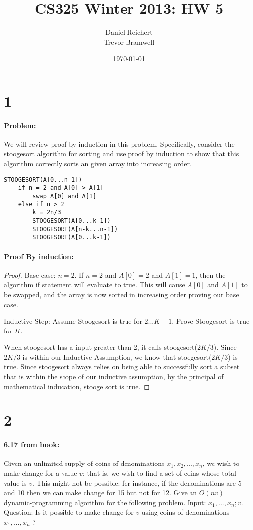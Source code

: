 \documentclass[12pt]{article}
\title{CS325 Winter 2013: HW 5}
\author{
    Daniel Reichert \\
    Trevor Bramwell \\
}
\date{\today}
\newcommand{\BigO}[1]{\ensuremath{O(#1)}}
\begin{document}
\maketitle
\section*{1}
\paragraph{Problem:}
We will review proof by induction in this problem. Specifically, consider the
stoogesort algorithm for sorting and use proof by induction to show that this
algorithm correctly sorts an given array into increasing order.
\begin{lstlisting}[mathescape]
STOOGESORT(A[0...n-1])
    if n = 2 and A[0] > A[1]
        swap A[0] and A[1]
    else if n > 2
        k = 2n/3
        STOOGESORT(A[0...k-1])
        STOOGESORT(A[n-k...n-1])
        STOOGESORT(A[0...k-1])
\end{lstlisting}
\paragraph{Proof By induction:}
\begin{proof}
Base case: $n = 2$.
If $n=2$ and $A[0] = 2$ and $A[1] = 1$, then the algorithm if statement will evaluate
to true.  This will cause $A[0]$ and $A[1]$ to be swapped, and the array is now
sorted in increasing order proving our base case.

Inductive Step:
Assume Stoogesort is true for $2...K-1$.
Prove Stoogesort is true for $K$.

When stoogesort has a input greater than 2, it calls stoogesort($2K/3$).  Since
$2K/3$ is within our Inductive Assumption, we know that stoogesort($2K/3$) is
true.  Since stoogesort always relies on being able to successfully sort a subset
that is within the scope of our inductive assumption, by the principal of
mathematical inducation, stooge sort is true.
\end{proof}

\section*{2}
\paragraph{6.17 from book:}
Given an unlimited supply of coins of denominations $x_1 , x_2 , . . . , x_n$,
we wish to make change for a value $v$; that is, we wish to find a set of coins
whose total value is $v$. This might not be possible: for instance, if the
denominations are 5 and 10 then we can make change for 15 but not for 12.
Give an $\BigO{nv}$ dynamic-programming algorithm for the following problem.
Input: $x_1 , . . . , x_n ; v$.
Question: Is it possible to make change for $v$ using coins of denominations
 $x_1 , . . . , x_n$ ?
\end{document}
